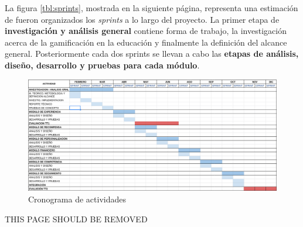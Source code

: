  \noindent
 La figura \ref{tbl:sprints}, mostrada en la siguiente página, representa una estimación de fueron
 organizados los {\it sprints} a lo largo del proyecto. La primer etapa de {\bf investigación
 y análisis general} contiene forma de trabajo, la investigación acerca de la gamificación en la educación
 y finalmente la definición del alcance general. Posteriormente cada dos sprints se llevan a cabo las {\bf
 etapas de análisis, diseño, desarrollo y pruebas para cada módulo}. \clearpage

    \begin{figure}
        \centering
        \includegraphics[width=1\textwidth]{analisis/diagrams/cronograma}
        \caption{Cronograma de actividades}
        \label{fig:awesome_image}
    \end{figure}

 \clearpage

    {\centering\color{primary}\Huge THIS PAGE SHOULD BE REMOVED}

